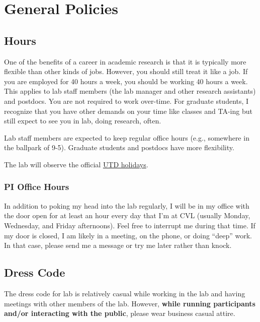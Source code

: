 \documentclass[
]{book}
\begin{document}
\hypertarget{general-policies}{%
\chapter{General Policies}\label{general-policies}}

\hypertarget{hours}{%
\section{Hours}\label{hours}}

One of the benefits of a career in academic research is that it is typically more flexible than other kinds of jobs. However, you should still treat it like a job. If you are employed for 40 hours a week, you should be working 40 hours a week. This applies to lab staff members (the lab manager and other research assistants) and postdocs. You are not required to work over-time. For graduate students, I recognize that you have other demands on your time like classes and TA-ing but still expect to see you in lab, doing research, often.

Lab staff members are expected to keep regular office hours (e.g., somewhere in the ballpark of 9-5). Graduate students and postdocs have more flexibility.

The lab will observe the official \href{https://www.utdallas.edu/hr/news/holidays/}{UTD holidays}.

\hypertarget{pi-office-hours}{%
\subsection{PI Office Hours}\label{pi-office-hours}}

In addition to poking my head into the lab regularly, I will be in my office with the door open for at least an hour every day that I'm at CVL (usually Monday, Wednesday, and Friday afternoons). Feel free to interrupt me during that time. If my door is closed, I am likely in a meeting, on the phone, or doing ``deep'' work. In that case, please send me a message or try me later rather than knock.

\hypertarget{dress-code}{%
\section{Dress Code}\label{dress-code}}

The dress code for lab is relatively casual while working in the lab and having meetings with other members of the lab. However,
\textbf{while running participants and/or interacting with the public}, please wear business casual attire.
\end{document}

